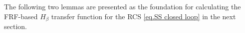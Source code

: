 The following two lemmas are presented as the foundation for calculating the FRF-based $H_\beta$ transfer function for the RCS \eqref{eq.SS closed loop} in the next section.
\begin{comment}
\begin{theorem}
    \label{th: Ali's theorem}
    \cite[Theorem 2]{dastjerdi2023frequency}, The zero equilibrium of the reset control system \eqref{eq.SS closed loop} with $C_3=0$ and $D_r=0$ is globally uniformly asymptotically
stable when $w = 0$, and the system has the UBIBS property for
any input $w$, which is a Bohl function if all of the following conditions are satisfied.
\begin{itemize}
        \item The base linear system is stable, and its open loop transfer function does not have any unstable pole-zero cancellation.
        \item $C_s(s) = 1$ and/or the reset instants have the well-posedness property.
        \item $-1<\gamma<1$.
        \item The transfer function $\frac{\beta_x L(s)C_s(s)R(s)+\varrho_x R(s)}{1+L(s)R(s)}$ must be SPR, where $\beta_x=-\beta$, and $\varrho_x=\frac{\varrho}{C_r}$, and $L(s)=C_1(s)C_2(s)G(s)$. \\
        \end{itemize}
\end{theorem}
\end{comment}
